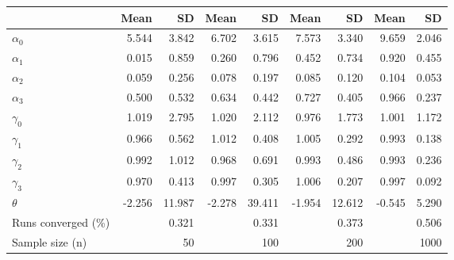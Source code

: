 
\begin{tabular}[t]{lrrrrrrrr}
\toprule
  & Mean & SD & Mean  & SD  & Mean   & SD   & Mean    & SD   \\
\midrule
$\alpha_{0}$ & 5.544 & 3.842 & 6.702 & 3.615 & 7.573 & 3.340 & 9.659 & 2.046\\
$\alpha_{1}$ & 0.015 & 0.859 & 0.260 & 0.796 & 0.452 & 0.734 & 0.920 & 0.455\\
$\alpha_{2}$ & 0.059 & 0.256 & 0.078 & 0.197 & 0.085 & 0.120 & 0.104 & 0.053\\
$\alpha_{3}$ & 0.500 & 0.532 & 0.634 & 0.442 & 0.727 & 0.405 & 0.966 & 0.237\\
$\gamma_{0}$ & 1.019 & 2.795 & 1.020 & 2.112 & 0.976 & 1.773 & 1.001 & 1.172\\
$\gamma_{1}$ & 0.966 & 0.562 & 1.012 & 0.408 & 1.005 & 0.292 & 0.993 & 0.138\\
$\gamma_{2}$ & 0.992 & 1.012 & 0.968 & 0.691 & 0.993 & 0.486 & 0.993 & 0.236\\
$\gamma_{3}$ & 0.970 & 0.413 & 0.997 & 0.305 & 1.006 & 0.207 & 0.997 & 0.092\\
$\theta$ & -2.256 & 11.987 & -2.278 & 39.411 & -1.954 & 12.612 & -0.545 & 5.290\\
Runs converged (\%) &  & 0.321 &  & 0.331 &  & 0.373 &  & 0.506\\
Sample size (n) &  & 50 &  & 100 &  & 200 &  & 1000\\
\bottomrule
\end{tabular}
